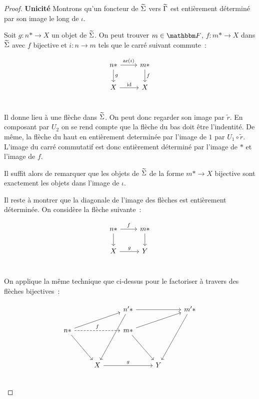 \begin{proof}
    \textbf{Unicité} Montrons qu'un foncteur de $\widetilde{\Sigma}$ vers $\widetilde{\Gamma}$ est entièrement
    déterminé par son image le long de $\iota$.

    Soit $g:n\ast\rightarrow X$ un objet de $\widetilde{\Sigma}$. On peut trouver $m\in\cf$,
    $f:m\ast\rightarrow X$ dans $\widetilde{\Sigma}$ avec $f$ bijective et $i : n\rightarrow m$
    tels que le carré suivant commute~:

    \[\begin{tikzcd}
        n\ast\arrow[r, "\text{ar}(i)"]\arrow[d, "g"] & m\ast\arrow[d, "f"] \\
        X\arrow[r, "\id"] & X \\
    \end{tikzcd}\]

    Il donne lieu à une flèche dans $\widetilde{\Sigma}$. On peut donc regarder son image par
    $\tilde{r}$.
    En composant par $U_2$ on se rend compte que la flèche du bas doit être l'indentité.
    De même, la flèche du haut en entièrement determinée par l'image de $1$ par
    $U_1\circ \tilde{r}$. L'image du carré commutatif est donc entièrement déterminé par
    l'image de $\ast$ et l'image de $f$.

    Il suffit alors de remarquer que les objets de $\widetilde{\Sigma}$ de la forme
    $m\ast\rightarrow X$ bijective sont exactement les objets dans l'image de
    $\iota$.

    Il reste à montrer que la diagonale de l'image des flèches est entièrement
    déterminée. On considère la flèche suivante~:

    \[\begin{tikzcd}
        n\ast\arrow[r, "f"]\arrow[d] & m\ast\arrow[d] \\
        X\arrow[r, "g"] & Y \\
    \end{tikzcd}\]

    On applique la même technique que ci-dessus pour le factoriser à travers des
    flèches bijectives~:

    \[\begin{tikzcd}
        & & n'\ast\arrow[rr]\arrow[dddl] & & m'\ast\arrow[dddl] \\
        n\ast\arrow[urr]\arrow[rr, dashed, "f"]\arrow[ddr] & &
            m\ast\arrow[urr]\arrow[ddr] & & \\
        & & & & \\
        & X\arrow[rr, "g"] & & Y & \\
    \end{tikzcd}\]


\end{proof}
